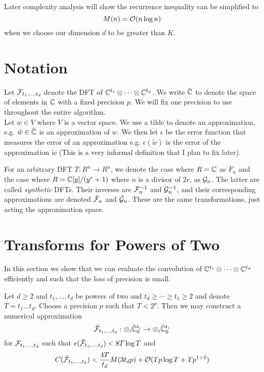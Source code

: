 Later complexity analysis will show the recurrence inequality can be simplified to
\[
    M(n) = \mathcal O(n \log n)
\]
when we choose our dimension $d$ to be greater than $K$.

\section{Notation}%
\label{sec:Notation}

Let $\mathcal F_{t_1, \ldots, t_d}$ denote the DFT of ${\mathbb C}^{t_1} \otimes \cdots \otimes {\mathbb C}^{t_d}$.
We write $\tilde{{\mathbb C}}$ to denote the space of elements in ${\mathbb C}$ with a fixed precision $p$. We will fix one precision to use throughout the entire algorithm.\\
Let $w \in V$ where $V$ is a vector space. We use a tilde to denote an approximation, e.g. $\tilde{w} \in \tilde{{\mathbb C}}$ is an approximation of $w$. We then let $\epsilon$ be the error function that measures the error of an approximation e.g. $\epsilon(\tilde{w})$ is the error of the approximation $\tilde{w}$ (This is a very informal definition that I plan to fix later).

For an arbitrary DFT $T: R^n \to R^n$, we denote the case where $R = {\mathbb C}$ as $F_n$ and the case where $R = {\mathbb C}[y]/(y^r + 1)$ where $n$ is a divisor of $2r$, as $\mathcal G_n$. The latter are called \emph{synthetic} DFTs.
Their inverses are $\mathcal F_n^{-1}$ and $\mathcal G_n^{-1}$, and their corresponding approximations are denoted $\tilde{\mathcal F}_n$ and $\tilde{\mathcal G}_n$. These are the same transformations, just acting the approximation space.


\section{Transforms for Powers of Two}

In this section we show that we can evaluate the convolution of ${\mathbb C}^{t_1} \otimes \cdots \otimes {\mathbb C}^{t_d}$ efficiently and such that the loss of precision is small.


\begin{theorem}
    Let $d \geq 2$ and $t_1, \ldots, t_d$ be powers of two and $t_d \geq \cdots \geq t_1 \geq 2$ and denote $T = t_1 \ldots t_d$. Choose a precision $p$ such that $T < 2^p$. Then we may construct a numerical approximation
    \[
        \tilde {\mathcal F}_{t_1, \ldots, t_d} : \otimes_i \tilde{{\mathbb C}}^{t_i}_0 \to \otimes_i \tilde{{\mathbb C}}^{t_i}_0
    \]
    for $\mathcal F_{t_1, \ldots, t_d}$ such that $\epsilon(\tilde{\mathcal F}_{t_1, \ldots, t_d}) < 8 T \log T$ and
    \[
        C(\tilde{\mathcal F}_{t_1, \ldots, t_d}) < \frac{4T}{t_d} M(3t_d p) + \mathcal O(Tp\log T + Tp^{1 + \delta})
    \]
\end{theorem}

